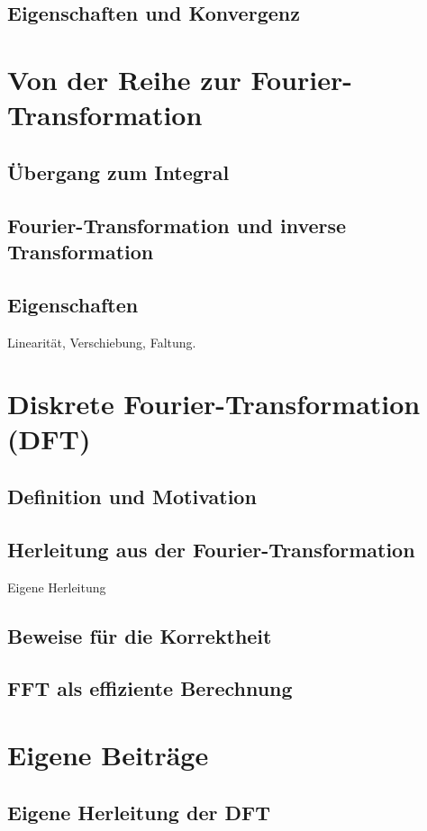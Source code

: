 \documentclass[a4paper,12pt]{article}
\theoremstyle{definition}
\theoremstyle{remark}
\begin{document}
\subsection{Eigenschaften und Konvergenz}

\section{Von der Reihe zur Fourier-Transformation}
\subsection{Übergang zum Integral}
\subsection{Fourier-Transformation und inverse Transformation}
\subsection{Eigenschaften}
Linearität, Verschiebung, Faltung.

\section{Diskrete Fourier-Transformation (DFT)}
\subsection{Definition und Motivation}
\subsection{Herleitung aus der Fourier-Transformation}
Eigene Herleitung
\subsection{Beweise für die Korrektheit}
\subsection{FFT als effiziente Berechnung}

\section{Eigene Beiträge}
\subsection{Eigene Herleitung der DFT}
\end{document}
